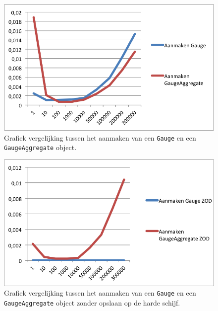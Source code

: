 \begin{figure}[!h]
  \centering
  \includegraphics[scale=1.0]{Afbeeldingen/Evaluatie/GaugeVSAggregate}
  \caption{Grafiek vergelijking tussen het aanmaken van een \texttt{Gauge} en een \texttt{GaugeAggregate} object.}
  \label{fig:GaugeVSAggregate}
\end{figure}

\begin{figure}[!h]
  \centering
  \includegraphics[scale=1.0]{Afbeeldingen/Evaluatie/GaugeVSAggregateZOD}
  \caption{Grafiek vergelijking tussen het aanmaken van een \texttt{Gauge} en een \texttt{GaugeAggregate} object zonder opslaan op de harde schijf.}
  \label{fig:GaugeVSAggregateZOD}
\end{figure}

